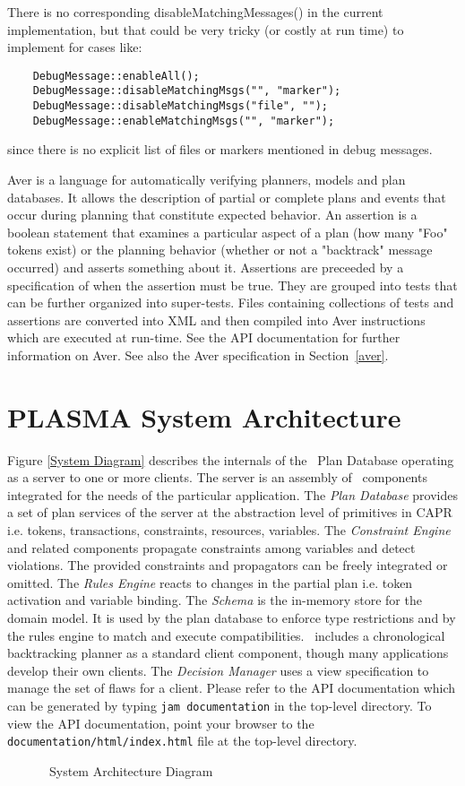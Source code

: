 \documentclass[10pt, letterpaper, twoside]{article}
\begin{document}
There is no corresponding disableMatchingMessages() in the current
implementation, but that could be very tricky (or costly at run time)
to implement for cases like:
\begin{verbatim}
	DebugMessage::enableAll();
	DebugMessage::disableMatchingMsgs("", "marker");
	DebugMessage::disableMatchingMsgs("file", "");
	DebugMessage::enableMatchingMsgs("", "marker");
\end{verbatim}
since there is no explicit list of files or markers mentioned in
debug messages.

Aver is a language for automatically verifying planners, models and plan
databases. It allows the description of partial or complete plans and
events that occur during planning that constitute expected behavior.  An
assertion is a boolean statement that examines a particular aspect of a
plan (how many "Foo" tokens exist) or the planning behavior (whether or not
a "backtrack" message occurred) and asserts something about it. Assertions
are preceeded by a specification of when the assertion must be true. They
are grouped into tests that can be further organized into
super-tests. Files containing collections of tests and assertions are
converted into XML and then compiled into Aver instructions which are
executed at run-time.  See the API documentation for further information on
Aver.  See also the Aver specification in Section~\ref{aver}.

\section{PLASMA System Architecture}

Figure \ref{System Diagram} describes the internals of the \ET\, Plan
Database operating as a server to one or more clients. The server is an
assembly of \ET\, components integrated for the needs of the particular
application. The {\em Plan Database} provides a set of plan services of the
server at the abstraction level of primitives in CAPR i.e. tokens,
transactions, constraints, resources, variables. The {\em Constraint
Engine} and related components propagate constraints among
variables and detect violations. The provided constraints and
propagators can be freely integrated or omitted. The {\em Rules Engine}
reacts to changes in the partial plan i.e. token activation and variable
binding. The {\em Schema} is the in-memory store for the domain model. It
is used by the plan database to enforce type restrictions and by the rules
engine to match and execute compatibilities.  \ET\, includes a chronological
backtracking planner as a standard client component, though many
applications develop their own clients. The {\em Decision Manager} uses a
view specification to manage the set of flaws for a client.  Please refer
to the API documentation which can be generated by typing {\tt jam
documentation} in the top-level directory.  To view the API documentation,
point your browser to the {\tt documentation/html/index.html} file at the
top-level directory.
\begin{figure}[t]
\centering{}
\caption{\ET\, System Architecture Diagram}
\label{SystemDiagram}
\end{figure}
\end{document}
